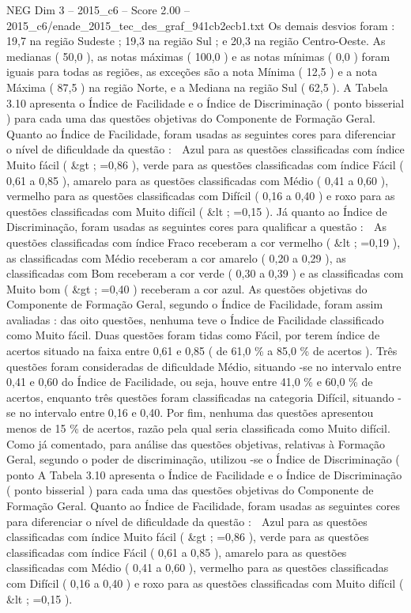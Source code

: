 \begin{textsample}{NEG Dim 3 – 2015\_c6 – Score 2.00 – 2015\_c6/enade\_2015\_tec\_des\_graf\_941cb2ecb1.txt}
Os demais desvios foram : 19,7 na região Sudeste ; 19,3 na região Sul ; e 20,3 na região Centro-Oeste.
As medianas ( 50,0 ), as notas máximas ( 100,0 ) e as notas mínimas ( 0,0 ) foram iguais para todas as regiões, as exceções são a nota Mínima ( 12,5 ) e a nota Máxima ( 87,5 ) na região Norte, e a Mediana na região Sul ( 62,5 ).
A Tabela 3.10 apresenta o Índice de Facilidade e o Índice de Discriminação ( ponto bisserial ) para cada uma das questões objetivas do Componente de Formação Geral.
Quanto ao Índice de Facilidade, foram usadas as seguintes cores para diferenciar o nível de dificuldade da questão :  Azul para as questões classificadas com índice Muito fácil ( \&gt ; =0,86 ), verde para as questões classificadas com índice Fácil ( 0,61 a 0,85 ), amarelo para as questões classificadas com Médio ( 0,41 a 0,60 ), vermelho para as questões classificadas com Difícil ( 0,16 a 0,40 ) e roxo para as questões classificadas com Muito difícil ( \&lt ; =0,15 ).
Já quanto ao Índice de Discriminação, foram usadas as seguintes cores para qualificar a questão :  As questões classificadas com índice Fraco receberam a cor vermelho ( \&lt ; =0,19 ), as classificadas com Médio receberam a cor amarelo ( 0,20 a 0,29 ), as classificadas com Bom receberam a cor verde ( 0,30 a 0,39 ) e as classificadas com Muito bom ( \&gt ; =0,40 ) receberam a cor azul.
As questões objetivas do Componente de Formação Geral, segundo o Índice de Facilidade, foram assim avaliadas : das oito questões, nenhuma teve o Índice de Facilidade classificado como Muito fácil.
Duas questões foram tidas como Fácil, por terem índice de acertos situado na faixa entre 0,61 e 0,85 ( de 61,0 \% a 85,0 \% de acertos ).
Três questões foram consideradas de dificuldade Médio, situando -se no intervalo entre 0,41 e 0,60 do Índice de Facilidade, ou seja, houve entre 41,0 \% e 60,0 \% de acertos, enquanto três questões foram classificadas na categoria Difícil, situando -se no intervalo entre 0,16 e 0,40.
Por fim, nenhuma das questões apresentou menos de 15 \% de acertos, razão pela qual seria classificada como Muito difícil.
Como já comentado, para análise das questões objetivas, relativas à Formação Geral, segundo o poder de discriminação, utilizou -se o Índice de Discriminação ( ponto A Tabela 3.10 apresenta o Índice de Facilidade e o Índice de Discriminação ( ponto bisserial ) para cada uma das questões objetivas do Componente de Formação Geral.
Quanto ao Índice de Facilidade, foram usadas as seguintes cores para diferenciar o nível de dificuldade da questão :  Azul para as questões classificadas com índice Muito fácil ( \&gt ; =0,86 ), verde para as questões classificadas com índice Fácil ( 0,61 a 0,85 ), amarelo para as questões classificadas com Médio ( 0,41 a 0,60 ), vermelho para as questões classificadas com Difícil ( 0,16 a 0,40 ) e roxo para as questões classificadas com Muito difícil ( \&lt ; =0,15 ).

\end{textsample}

